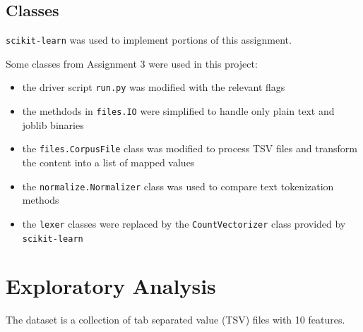 \documentclass[11pt]{article}
\begin{document}
\subsection*{Classes}
\texttt{scikit-learn} was used to implement portions of this assignment.

Some classes from Assignment 3 were used in this project:
\begin{itemize}
    \item the driver script \texttt{run.py} was modified with the relevant flags
    \item the methdods in \texttt{files.IO} were simplified to handle only plain text and joblib binaries
    \item the \texttt{files.CorpusFile} class was modified to process TSV files and transform the content into a list of mapped values
    \item the \texttt{normalize.Normalizer} class was used to compare text tokenization methods
    \item the \texttt{lexer} classes were replaced by the \texttt{CountVectorizer} class provided by \texttt{scikit-learn}
\end{itemize}

\section*{Exploratory Analysis}
The dataset is a collection of tab separated value (TSV) files with 10 features.
\end{document}
